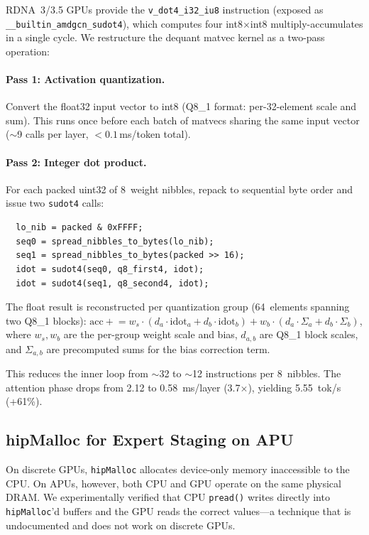 \documentclass[10pt]{article}
\begin{document}
RDNA~3/3.5 GPUs provide the \texttt{v\_dot4\_i32\_iu8} instruction (exposed as \texttt{\_\_builtin\_amdgcn\_sudot4}), which computes four int8$\times$int8 multiply-accumulates in a single cycle. We restructure the dequant matvec kernel as a two-pass operation:

\paragraph{Pass 1: Activation quantization.} Convert the float32 input vector to int8 (Q8\_1 format: per-32-element scale and sum). This runs once before each batch of matvecs sharing the same input vector ($\sim$9 calls per layer, $< 0.1$\,ms/token total).

\paragraph{Pass 2: Integer dot product.} For each packed uint32 of 8~weight nibbles, repack to sequential byte order and issue two \texttt{sudot4} calls:

\begin{verbatim}
  lo_nib = packed & 0xFFFF;
  seq0 = spread_nibbles_to_bytes(lo_nib);
  seq1 = spread_nibbles_to_bytes(packed >> 16);
  idot = sudot4(seq0, q8_first4, idot);
  idot = sudot4(seq1, q8_second4, idot);
\end{verbatim}

The float result is reconstructed per quantization group (64~elements spanning two Q8\_1 blocks): $\text{acc} \mathrel{+}= w_s \cdot (d_a \cdot \text{idot}_a + d_b \cdot \text{idot}_b) + w_b \cdot (d_a \cdot \Sigma_a + d_b \cdot \Sigma_b)$, where $w_s, w_b$ are the per-group weight scale and bias, $d_{a,b}$ are Q8\_1 block scales, and $\Sigma_{a,b}$ are precomputed sums for the bias correction term.

This reduces the inner loop from $\sim$32 to $\sim$12 instructions per 8~nibbles. The attention phase drops from 2.12 to 0.58~ms/layer (3.7$\times$), yielding 5.55~tok/s (+61\%).

\subsection{hipMalloc for Expert Staging on APU}

On discrete GPUs, \texttt{hipMalloc} allocates device-only memory inaccessible to the CPU. On APUs, however, both CPU and GPU operate on the same physical DRAM. We experimentally verified that CPU \texttt{pread()} writes directly into \texttt{hipMalloc}'d buffers and the GPU reads the correct values---a technique that is undocumented and does not work on discrete GPUs.
\end{document}
